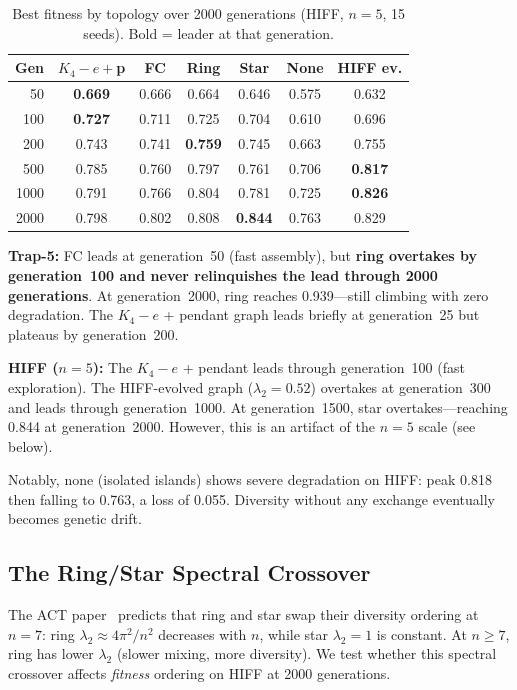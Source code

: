 \documentclass[sigconf,nonacm]{acmart}
\begin{document}
\begin{table}[h]
\caption{Best fitness by topology over 2000 generations (HIFF,
  $n=5$, 15 seeds). Bold = leader at that generation.}
\label{tab:convergence-hiff}
\centering
\small
\begin{tabular}{rcccccc}
\toprule
\textbf{Gen} & \textbf{$K_4{-}e{+}$p} & \textbf{FC} & \textbf{Ring} & \textbf{Star} & \textbf{None} & \textbf{HIFF ev.} \\
\midrule
 50  & \textbf{0.669} & 0.666 & 0.664 & 0.646 & 0.575 & 0.632 \\
100  & \textbf{0.727} & 0.711 & 0.725 & 0.704 & 0.610 & 0.696 \\
200  & 0.743 & 0.741 & \textbf{0.759} & 0.745 & 0.663 & 0.755 \\
500  & 0.785 & 0.760 & 0.797 & 0.761 & 0.706 & \textbf{0.817} \\
1000 & 0.791 & 0.766 & 0.804 & 0.781 & 0.725 & \textbf{0.826} \\
2000 & 0.798 & 0.802 & 0.808 & \textbf{0.844} & 0.763 & 0.829 \\
\bottomrule
\end{tabular}
\end{table}

\textbf{Trap-5:} FC leads at generation~50 (fast assembly), but
\textbf{ring overtakes by generation~100 and never relinquishes the
lead through 2000 generations}. At generation~2000, ring reaches
0.939---still climbing with zero degradation. The $K_4{-}e$ + pendant
graph leads briefly at generation~25 but plateaus by generation~200.

\textbf{HIFF ($n=5$):} The $K_4{-}e$ + pendant leads through
generation~100 (fast exploration). The HIFF-evolved graph
($\lambda_2 = 0.52$) overtakes at generation~300 and leads through
generation~1000. At generation~1500, star overtakes---reaching 0.844
at generation~2000. However, this is an artifact of the $n=5$ scale
(see below).

Notably, none (isolated islands) shows severe degradation on HIFF:
peak 0.818 then falling to 0.763, a loss of 0.055. Diversity without
any exchange eventually becomes genetic drift.

\subsection{The Ring/Star Spectral Crossover}

The ACT paper~\cite{langer2026} predicts that ring and star swap
their diversity ordering at $n = 7$: ring $\lambda_2 \approx
4\pi^2/n^2$ decreases with $n$, while star $\lambda_2 = 1$ is
constant. At $n \geq 7$, ring has lower $\lambda_2$ (slower mixing,
more diversity). We test whether this spectral crossover affects
\emph{fitness} ordering on HIFF at 2000 generations.
\end{document}
